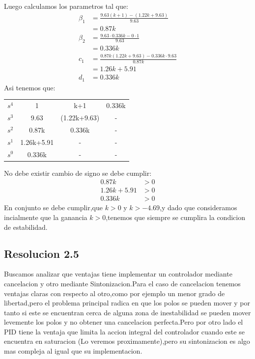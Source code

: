 \documentclass[
  11pt,
  letterpaper,
   addpoints,
   answers
  ]{exam}
\begin{document}
\begin{questions}
\begin{solution}
\begin{center}
\begin{tabular}{|c|c|c|c|}
        \hline
    \end{tabular}
\end{center}
Luego calculamos los parametros tal que:
\begin{align}
    \beta_{1}&= \frac{9.63(k+1)-(1.22k+9.63)}{9.63}\\
             &=0.87k\\
    \beta_{2}&= \frac{9.63 \cdot 0.336k - 0 \cdot 1}{9.63}\\
             &=0.336k\\
    c_{1} &= \frac{0.87k(1.22k+9.63)-0.336k\cdot 9.63}{0.87k}\\
            &= 1.26k + 5.91\\
    d_{1} &= 0.336k
\end{align}
Asi tenemos que:
\begin{center}
    \begin{tabular}{|c|c|c|c|}
        \hline
        $s^{4}$ & 1  & k+1  & 0.336k \\
        $s^{3}$ & 9.63 & (1.22k+9.63)  & -\\
        $s^{2}$ & 0.87k & 0.336k  & -\\
        $s^{1}$ & 1.26k+5.91  & -   & -\\
        $s^{0}$ & 0.336k & -  & - \\
        \hline
    \end{tabular}
\end{center}
No debe existir cambio de signo se debe cumplir:
\begin{align}
    0.87k &> 0\\
    1.26k + 5.91 &> 0\\
    0.336k &> 0
\end{align}
En conjunto se debe cumplir,que $k>0$ y $k>-4.69$,y dado que consideramos incialmente que la ganancia $k>0$,tenemos que siempre se cumplira la condicion de estabilidad.
\subsection*{Resolucion 2.5}
Buscamos analizar que ventajas tiene implementar un controlador mediante cancelacion y otro mediante Sintonizacion.Para el caso de cancelacion tenemos ventajas claras con respecto al otro,como por ejemplo un menor grado de libertad,pero el problema principal radica en que los polos se pueden mover y por tanto si este se encuentran cerca de alguna zona de inestabilidad se pueden mover levemente los polos y no obtener una cancelacion perfecta.Pero por otro lado el PID tiene la ventaja que limita la accion integral del controlador cuando este se encuentra en saturacion (Lo veremos proximamente),pero su sintonizacion es algo mas compleja al igual que su implementacion.
\end{solution}
\end{questions}
\newpage
\end{document}
